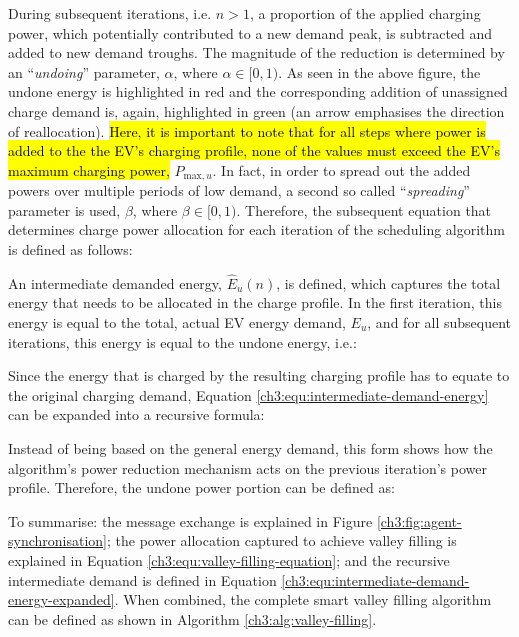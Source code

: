 During subsequent iterations, i.e. $n>1$, a proportion of the applied charging power, which potentially contributed to a new demand peak, is subtracted and added to new demand troughs.
The magnitude of the reduction is determined by an ``\textit{undoing}'' parameter, $\alpha$, where $\alpha \in [0, 1)$.
As seen in the above figure, the undone energy is highlighted in red and the corresponding addition of unassigned charge demand is, again, highlighted in green (an arrow emphasises the direction of reallocation).
\hl{Here, it is important to note that for all steps where power is added to the the EV's charging profile, none of the values must exceed the EV's maximum charging power, }$P_{\text{max},u}$.
In fact, in order to spread out the added powers over multiple periods of low demand, a second so called ``\textit{spreading}'' parameter is used, $\beta$, where $\beta \in [0, 1)$.
Therefore, the subsequent equation that determines charge power allocation for each iteration of the scheduling algorithm is defined as follows:



An intermediate demanded energy, $\hat{E}_u(n)$, is defined, which captures the total energy that needs to be allocated in the charge profile.
In the first iteration, this energy is equal to the total, actual EV energy demand, $E_u$, and for all subsequent iterations, this energy is equal to the undone energy, i.e.:



Since the energy that is charged by the resulting charging profile has to equate to the original charging demand, Equation \ref{ch3:equ:intermediate-demand-energy} can be expanded into a recursive formula:



Instead of being based on the general energy demand, this form shows how the algorithm's power reduction mechanism acts on the previous iteration's power profile.
Therefore, the undone power portion can be defined as:



To summarise: the message exchange is explained in Figure \ref{ch3:fig:agent-synchronisation}; the power allocation captured to achieve valley filling is explained in Equation \ref{ch3:equ:valley-filling-equation}; and the recursive intermediate demand is defined in Equation \ref{ch3:equ:intermediate-demand-energy-expanded}.
When combined, the complete smart valley filling algorithm can be defined as shown in Algorithm \ref{ch3:alg:valley-filling}.















